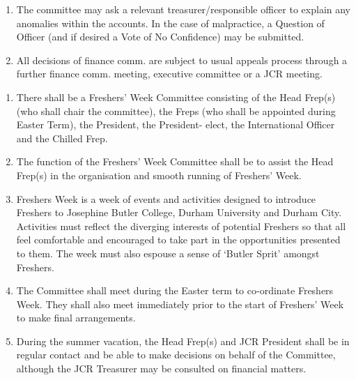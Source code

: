 \begin{enumerate}
    \item The committee may ask a relevant treasurer/responsible officer to explain any anomalies within the accounts. In the case of malpractice, a Question of Officer (and if desired a Vote of No Confidence) may be submitted.
    \item All decisions of finance comm. are subject to usual appeals process through a further finance comm. meeting, executive committee or a JCR meeting.
\end{enumerate}



\begin{enumerate}
    \item There shall be a Freshers’ Week Committee consisting of the Head Frep(s) (who shall chair the committee), the Freps (who shall be appointed during Easter Term), the President, the President- elect, the International Officer and the Chilled Frep.
    \item The function of the Freshers’ Week Committee shall be to assist the Head Frep(s) in the organisation and smooth running of Freshers’ Week.
    \item Freshers Week is a week of events and activities designed to introduce Freshers to Josephine Butler College, Durham University and Durham City. Activities must reflect the diverging interests of potential Freshers so that all feel comfortable and encouraged to take part in the opportunities presented to them. The week must also espouse a sense of ‘Butler Sprit’ amongst Freshers.
    \item The Committee shall meet during the Easter term to co-ordinate Freshers Week. They shall also meet immediately prior to the start of Freshers’ Week to make final arrangements.
    \item During the summer vacation, the Head Frep(s) and JCR President shall be in regular contact and be able to make decisions on behalf of the Committee, although the JCR Treasurer may be consulted on financial matters.
\end{enumerate}



